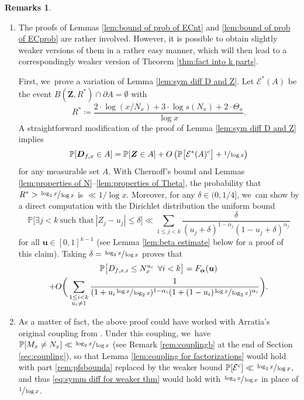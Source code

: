 \documentclass[10pt]{amsart}
\newenvironment{enumeratea}
{\bgroup\def\theenumi{\alph{enumi}}\begin{enumerate}}
{\end{enumerate}\egroup}
\newcommand{\bu}{{\boldsymbol u}}
\newcommand{\bD}{{\boldsymbol D}}
\newcommand{\bZ}{{\boldsymbol Z}}
\newcommand{\PP}{\mathbb{P}}
\newcommand{\boldalpha}{\boldsymbol{\alpha}}
\newcommand{\EC}{\mathcal{E}}
\newcommand{\bg}{\big}
\newcommand{\bgg}{\Big}
\newcommand{\bggg}{\bigg}
\theoremstyle{plain}
\theoremstyle{definition}
\newtheorem*{remss}{Remarks}
\begin{document}
\skpt
\begin{remss}
\begin{enumeratea}
\item\label{rem:pfsbounda}
The proofs of Lemmas \ref{lem:bound of prob of ECnt} and \ref{lem:bound of prob of ECprob} are rather involved. However, it is possible to obtain slightly weaker versions of them in a rather easy manner, which will then lead to a correspondingly weaker version of Theorem \ref{thm:fact into k parts}.

First, we~prove a variation of Lemma \ref{lem:sym diff D and Z}. Let $\EC^*(A)$ be the event $B(\bZ,R^*)\cap \partial A=\emptyset$ with
\[
R^* \coloneqq \frac{2\cdot \log(x/N_x) + 3\cdot \log s(N_x) + 2\cdot \Theta_x}{\log x}.
\]
A straightforward modification of the proof of Lemma \ref{lem:sym diff D and Z} implies
\begin{equation}
\label{eq:symm diff for weaker thm}
\PP[\bD_{f, x} \in A] = \PP[\bZ \in A] + O\left(\PP\bg[\EC^*(A)^c\bg] + \sfrac{1}{\log x}\right)
\end{equation}
for any measurable set $A$. With Chernoff's bound and Lemmas \ref{lem:properties of N}--\ref{lem:properties of Theta}, the probability that $R^*>\sfrac{\log_2 x}{\log x}$ is $\ll 1/\log x$. Moreover, for any $\delta\in(0,1/4]$, we~can show by a direct computation with the Dirichlet distribution the uniform bound
\[
\PP\bgg[\exists j < k\ \text{such that}\ |Z_j-u_j|\le \delta \bgg] \ll \sum_{1\le j<k} \frac{\delta}{(u_j+\delta)^{1-\alpha_j}(1-u_j+\delta)^{\alpha_j}}
\]
for all $\bu\in [0,1]^{k-1}$ (see Lemma \ref{lem:beta estimate} below for a proof of this claim). Taking \hbox{$\delta=\sfrac{\log_2x}{\log x}$} proves that
\begin{multline*}
\PP\bg[D_{f,x,i} \le N_x^{u_i}\ \, \forall i < k\bg] = F_{\boldalpha}(\bu) \\
+ O\bggg(\sum_{\substack{1 \le i < k \\ u_i \ne 1}} \frac{1}{(1+u_i\sfrac{\log x}{\log_2x})^{1-\alpha_i}(1+(1-u_i)\sfrac{\log x}{\log_2x})^{\alpha_i}}\bggg).
\end{multline*}

\item\label{rem:pfsboundb}
As a matter of fact, the above proof could have worked with Arratia's original coupling from \cite{Arratia02}. Under this coupling, we~have $\PP[M_x \ne N_x] \ll \sfrac{\log_2x}{\log x}$ (see Remark \eqref{rem:couplingb} at the end of Section \ref{sec:coupling}), so that Lemma \ref{lem:coupling for factorizations} would hold with part \eqref{rem:pfsbounda} replaced by the weaker bound $\PP[\EC^c]\ll \sfrac{\log_2x}{\log x}$, and thus \eqref{eq:symm diff for weaker thm} would hold with $\sfrac{\log_2x}{\log x}$ in place of $\sfrac{1}{\log x}$.
\end{enumeratea}
\end{remss}
\end{document}
